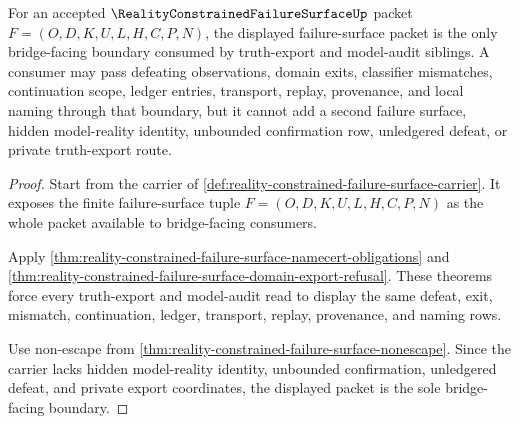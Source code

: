 \begin{theorem}
\label{thm:reality-constrained-failure-surface-bridge-boundary}
For an accepted $\RealityConstrainedFailureSurfaceUp$ packet $F=(O,D,K,U,L,H,C,P,N)$, the displayed failure-surface packet is the only bridge-facing boundary consumed by truth-export and model-audit siblings. A consumer may pass defeating observations, domain exits, classifier mismatches, continuation scope, ledger entries, transport, replay, provenance, and local naming through that boundary, but it cannot add a second failure surface, hidden model-reality identity, unbounded confirmation row, unledgered defeat, or private truth-export route.
\end{theorem}
\begin{proof}
Start from the carrier of \autoref{def:reality-constrained-failure-surface-carrier}. It exposes the finite failure-surface tuple $F=(O,D,K,U,L,H,C,P,N)$ as the whole packet available to bridge-facing consumers.

Apply \autoref{thm:reality-constrained-failure-surface-namecert-obligations} and \autoref{thm:reality-constrained-failure-surface-domain-export-refusal}. These theorems force every truth-export and model-audit read to display the same defeat, exit, mismatch, continuation, ledger, transport, replay, provenance, and naming rows.

Use non-escape from \autoref{thm:reality-constrained-failure-surface-nonescape}. Since the carrier lacks hidden model-reality identity, unbounded confirmation, unledgered defeat, and private export coordinates, the displayed packet is the sole bridge-facing boundary.
\end{proof}



